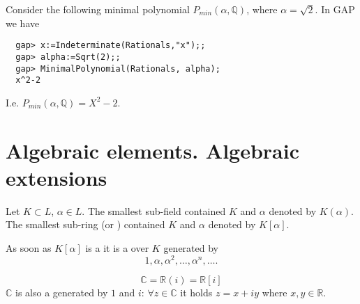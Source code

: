 \begin{gapexample}
  Consider the following minimal polynomial
  $P_{min}\left(\alpha, \mathbb{Q}\right)$, where $\alpha =
  \sqrt{2}$. In GAP \cite{url:gap} we have
\begin{verbatim}
  gap> x:=Indeterminate(Rationals,"x");;
  gap> alpha:=Sqrt(2);;
  gap> MinimalPolynomial(Rationals, alpha);
  x^2-2
\end{verbatim}
I.e. $P_{min}\left(\alpha, \mathbb{Q}\right) = X^2 -2$.
\label{ex:minpolynomial}
\end{gapexample}

\section{Algebraic elements. Algebraic extensions}

\begin{definition}
  Let $K \subset L$, $\alpha \in L$. The smallest sub-field contained
  $K$ and $\alpha$ denoted by $K\left(\alpha\right)$. The smallest
  sub-ring (or ) contained $K$ and $\alpha$ denoted by $K\left[\alpha\right]$.
\end{definition}

As soon as $K\left[\alpha\right]$ is a  it is a
 over $K$ generated by
\[
1, \alpha, \alpha^2, \dots,
\alpha^n, \dots.
\]

\begin{example}[$\mathbb{C}$]
  \[
  \mathbb{C} = \mathbb{R}\left(i\right) = \mathbb{R}\left[i\right]
  \]
  $\mathbb{C}$ is also a  generated by $1$
  and $i$: $\forall z \in \mathbb{C}$ it holds $z = x + i y$ where
  $x,y \in \mathbb{R}$.
\end{example}

